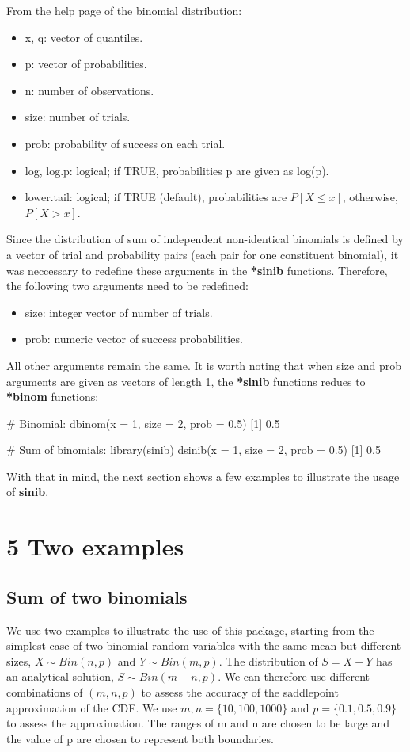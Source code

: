 From the help page of the binomial distribution: 

\begin{itemize}
\item x, q: vector of quantiles.
\item p: vector of probabilities.
\item n: number of observations. 
\item size: number of trials. 
\item prob: probability of success on each trial.
\item log, log.p: logical; if TRUE, probabilities p are given as log(p). 
\item lower.tail: logical; if TRUE (default), probabilities are $P[X \leq x]$, otherwise, $P[X > x]$. 
\end{itemize}

Since the distribution of sum of independent non-identical binomials is defined by a vector of trial and probability pairs (each pair for one constituent binomial), it was neccessary to redefine these arguments in the \textbf{*sinib} functions. Therefore, the following two arguments need to be redefined:

\begin{itemize}
\item size: integer vector of number of trials. 
\item prob: numeric vector of success probabilities.
\end{itemize}

All other arguments remain the same. It is worth noting that when size and prob arguments are given as vectors of length 1, the \textbf{*sinib} functions redues to \textbf{*binom} functions: 

\begin{example}
# Binomial:
dbinom(x = 1, size = 2, prob = 0.5)
[1] 0.5


# Sum of binomials:
library(sinib)
dsinib(x = 1, size = 2, prob = 0.5)
[1] 0.5
\end{example}

With that in mind, the next section shows a few examples to illustrate the usage of \textbf{sinib}. 

\section{5 Two examples}
\subsection{Sum of two binomials}
We use two examples to illustrate the use of this package, starting from the simplest case of two binomial random variables with the same mean but different sizes, $X \sim Bin(n,p)$ and $Y \sim Bin(m,p)$. The distribution of $S = X+Y$ has an analytical solution, $S \sim Bin(m+n,p)$. We can therefore use different combinations of $(m,n,p)$ to assess the accuracy of the saddlepoint approximation of the CDF. We use $m,n = \{10, 100, 1000\}$ and $p = \{0.1, 0.5, 0.9\}$ to assess the approximation. The ranges of m and n are chosen to be large and the value of p are chosen to represent both boundaries. 

